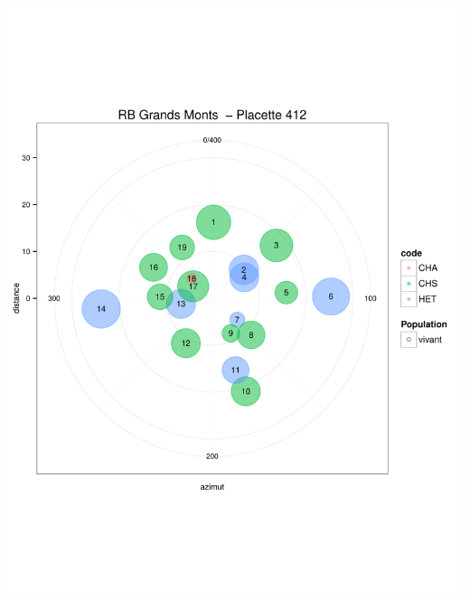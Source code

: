 \documentclass[a4paper]{book}\usepackage[]{graphicx}\usepackage[]{color}
\makeatletter
\def\maxwidth{ %
  \ifdim\Gin@nat@width>\linewidth
    \linewidth
  \else
    \Gin@nat@width
  \fi
}
\newenvironment{knitrout}{}{} %
\makeatother
\begin{document}
\begin{knitrout}
{\centering \includegraphics[width=\maxwidth]{Figures/PlanArbres-34} 

}





\end{knitrout}
\end{document}
